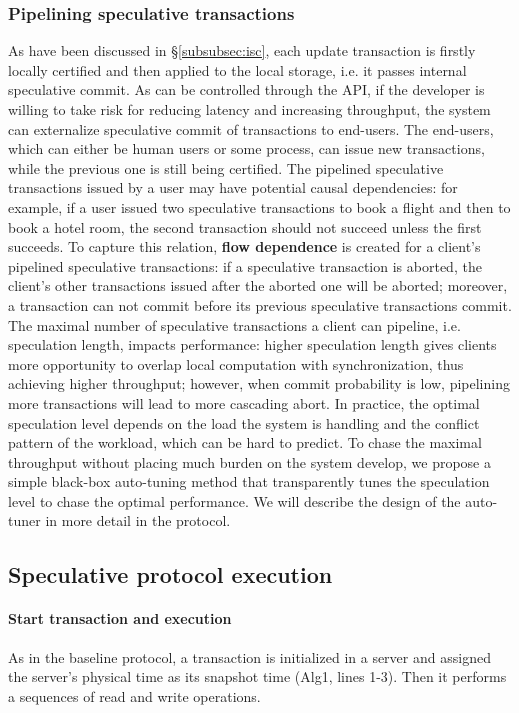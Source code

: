 \subsubsection{Pipelining speculative transactions}
As have been discussed in \S \ref{subsubsec:isc}, each update transaction is firstly locally certified and then applied to the local storage, i.e. it passes internal speculative commit. As can be controlled through the API, if the developer is willing to take risk for reducing latency and increasing throughput, the system can externalize speculative commit of transactions to end-users. The end-users, which can either be human users or some process, can issue new transactions, while the previous one is still being certified. The pipelined speculative transactions issued by a user may have potential causal dependencies: for example, if a user issued two speculative transactions to book a flight and then to book a hotel room, the second transaction should not succeed unless the first succeeds. To capture this relation, \textbf{flow dependence} is created for a client's pipelined speculative transactions: if a speculative transaction is aborted, the client's other transactions issued after the aborted one will be aborted; moreover, a transaction can not commit before its previous speculative transactions commit. The maximal number of speculative transactions a client can pipeline, i.e. speculation length, impacts performance: higher speculation length gives clients more opportunity to overlap local computation with synchronization, thus achieving higher throughput; however, when commit probability is low, pipelining more transactions will lead to more cascading abort. In practice, the optimal speculation level depends on the load the system is handling and the conflict pattern of the workload, which can be hard to predict. To chase the maximal throughput without placing much burden on the system develop, we propose a simple black-box auto-tuning method that transparently tunes the speculation level to chase the optimal performance. We will describe the design of the auto-tuner in more detail in the protocol.

\subsection{Speculative protocol execution}
\label{subsec:execution}



\paragraph{Start transaction and execution} As in the baseline protocol, a transaction is initialized in a server and assigned the server's physical time as its snapshot time (Alg1, lines 1-3). Then it performs a sequences of read and write operations.

